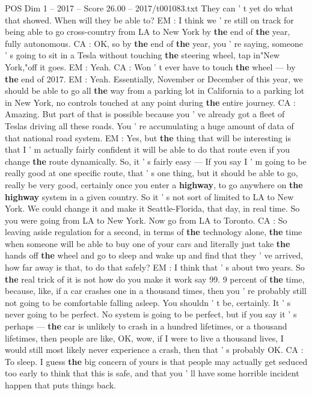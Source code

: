 \begin{textsample}{POS Dim 1 – 2017 – Score 26.00 – 2017/t001083.txt}
They can ' t yet do what that showed.
When will they be able to?
EM : I think we ' re still on track for being able to go cross-country from LA to New York by \textbf{the} end of \textbf{the} year, fully autonomous.
CA : OK, so by \textbf{the} end of \textbf{the} year, you ' re saying, someone ' s going to sit in a Tesla without touching \textbf{the} steering wheel, tap in"New York,"off it goes.
EM : Yeah.
CA : Won ' t ever have to touch \textbf{the} wheel — by \textbf{the} end of 2017.
EM : Yeah.
Essentially, November or December of this year, we should be able to go all \textbf{the} way from a parking lot in California to a parking lot in New York, no controls touched at any point during \textbf{the} entire journey.
CA : Amazing.
But part of that is possible because you ' ve already got a fleet of Teslas driving all these roads.
You ' re accumulating a huge amount of data of that national road system.
EM : Yes, but \textbf{the} thing that will be interesting is that I ' m actually fairly confident it will be able to do that route even if you change \textbf{the} route dynamically.
So, it ' s fairly easy — If you say I ' m going to be really good at one specific route, that ' s one thing, but it should be able to go, really be very good, certainly once you enter a \textbf{highway}, to go anywhere on \textbf{the} \textbf{highway} system in a given country.
So it ' s not sort of limited to LA to New York.
We could change it and make it Seattle-Florida, that day, in real time.
So you were going from LA to New York.
Now go from LA to Toronto.
CA : So leaving aside regulation for a second, in terms of \textbf{the} technology alone, \textbf{the} time when someone will be able to buy one of your cars and literally just take \textbf{the} hands off \textbf{the} wheel and go to sleep and wake up and find that they ' ve arrived, how far away is that, to do that safely?
EM : I think that ' s about two years.
So \textbf{the} real trick of it is not how do you make it work say 99. 9 percent of \textbf{the} time, because, like, if a car crashes one in a thousand times, then you ' re probably still not going to be comfortable falling asleep.
You shouldn ' t be, certainly.
It ' s never going to be perfect.
No system is going to be perfect, but if you say it ' s perhaps — \textbf{the} car is unlikely to crash in a hundred lifetimes, or a thousand lifetimes, then people are like, OK, wow, if I were to live a thousand lives, I would still most likely never experience a crash, then that ' s probably OK.
CA : To sleep.
I guess \textbf{the} big concern of yours is that people may actually get seduced too early to think that this is safe, and that you ' ll have some horrible incident happen that puts things back.

\end{textsample}
